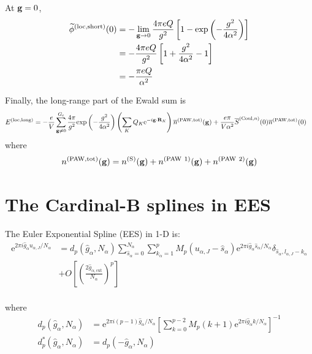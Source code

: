 \documentclass[paper=a4, fontsize=11pt]{article} %
\numberwithin{equation}{section} %
\numberwithin{figure}{section} %
\numberwithin{table}{section} %
\newcommand{\wt}{\widetilde}
\newcommand{\ol}{\overline}
\newcommand{\bg}{{\bf{g}}}
\newcommand{\bR}{{\bf{R}}}
\newcommand{\rexp}{{\mathrm{exp}}}
\newcommand{\rS}{{\mathrm{S}}}
\newcommand{\re}{{\mathrm{e}}}
\newcommand{\rCo}{{\mathrm{Coul}}}
\newcommand{\rshort}{{\mathrm{short}}}
\newcommand{\rlong}{{\mathrm{long}}}
\newcommand{\rP}{{\mathrm{PAW}}}
\newcommand{\rlo}{{\mathrm{loc}}}
\newcommand{\rtot}{{\mathrm{tot}}}
\newcommand{\ibgR}{i\bg\cdot\bR}
\newcommand{\al}{{\alpha}}
\newcommand{\Gc}{{G_{\mathrm{c}}}}
\begin{document}
At $\bg=0$,
\begin{equation}
\begin{split}
\wt{\phi}^{(\rlo,\rshort)}(0)
&= -\lim_{\bg \rightarrow 0}\frac{4\pi eQ}{g^2}\left[1-\rexp\left(-\frac{g^2}{4\alpha^2}\right)\right] \\
&= -\frac{4\pi eQ}{g^2}\left[1+\frac{g^2}{4\alpha^2}-1\right] \\
&= -\frac{\pi eQ}{\alpha^2}
\end{split}
\end{equation}

Finally, the long-range part of the Ewald sum is
\begin{equation}
\begin{split}
E^{(\rlo,\rlong)}
&= - \frac{e}{V} \sum_{\bg \neq 0}^{\Gc} \frac{4\pi}{g^2} \rexp\left(-\frac{g^2}{4\alpha^2}\right) \left(\sum_{K} Q_K \re^{-\ibgR_{K}}\right) \ol n^{(\rP,\rtot)}(\bg)+\frac{e\pi}{V \alpha^2} \ol S^{(\rCo,n)}(0) \ol n^{(\rP,\rtot)}(0)
\end{split}
\end{equation}
where
\begin{equation}
n^{(\rP,\rtot)}(\bg) = n^{(\rS)}(\bg) + n^{(\rP\ 1)}(\bg) + n^{(\rP\ 2)}(\bg)
\end{equation}


\newpage
\section{The Cardinal-B splines in EES}\label{App:Dg}

The Euler Exponential Spline (EES) in 1-D is:
\begin{equation}
\begin{split}
\re^{2\pi i\hat{g}_{\alpha}u_{\alpha,J}/N_\alpha}
 & = d_p(\hat{g}_{\alpha},N_\alpha)\sum_{\hat s_\alpha=0}^{N_\al} \sum_{k_\al=1}^p M_p(u_{\alpha,J}-\hat s_{\al})\re^{2\pi i\hat{g}_{\alpha}\hat s_{\alpha}/N_\alpha} \delta_{\hat s_\al,l_{\al,J}-k_\al} \\
 &+ O\left[\left(\frac{2 \hat g_{\al,\mathrm{cut}}}{N_\al}\right)^p\right] \\
 \end{split}
\end{equation}

where
\begin{equation}
\begin{split}
d_p(\hat{g}_{\alpha},N_\alpha)  &= \re^{2\pi i (p-1) \hat{g}_{\alpha}/N_\alpha}\left[\sum_{k=0}^{p-2} M_p(k+1) \re^{2\pi i \hat{g}_{\alpha} k/N_\alpha}\right]^{-1} \\
d_p^*(\hat{g}_{\alpha},N_\alpha) &= d_p(-\hat{g}_{\alpha},N_\alpha) \\
\end{split}
\end{equation}
\end{document}
